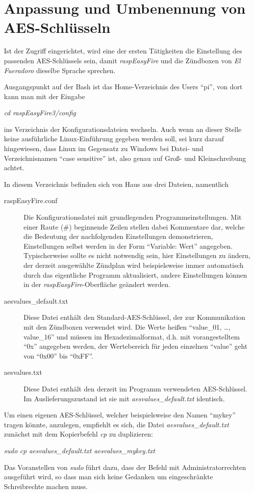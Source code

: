 \documentclass[paper=a4, parskip, numbers=noenddot, toc=listof, headsepline]{scrbook}
\newcommand{\anlage}{\emph{El Fueradoro}}
\newcommand{\REF}{\emph{raspEasyFire}}
\begin{document}
		\section{Anpassung und Umbenennung von AES-Schlüsseln}

			Ist der Zugriff eingerichtet, wird eine der ersten Tätigkeiten die Einstellung des passenden AES-Schlüssels sein, damit {\REF} und die Zündboxen von {\anlage} dieselbe Sprache sprechen.

			Ausgangspunkt auf der Bash ist das Home-Verzeichnis des Users \enquote{pi}, von dort kann man mit der Eingabe
			\begin{center}
				\emph{cd raspEasyFire3/config}
			\end{center}
			ins Verzeichnis der Konfigurationsdateien wechseln. Auch wenn an dieser Stelle keine ausführliche Linux-Einführung gegeben werden soll, sei kurz darauf hingewiesen, dass Linux im Gegensatz zu Windows bei Datei- und Verzeichnisnamen \enquote{case sensitive} ist, also genau auf Groß- und Kleinschreibung achtet.

			In diesem Verzeichnis befinden sich von Haus aus drei Dateien, namentlich
			\begin{description}
				\item[raspEasyFire.conf] Die Konfigurationsdatei mit grundlegenden Programmeinstellungen. Mit einer Raute (\#) beginnende Zeilen stellen dabei Kommentare dar, welche die Bedeutung der nachfolgenden Einstellungen demonstrieren, Einstellungen selbst werden in der Form \enquote{Variable: Wert} angegeben. Typischerweise sollte es nicht notwendig sein, hier Einstellungen zu ändern, der derzeit ausgewählte Zündplan wird beispielsweise immer automatisch durch das eigentliche Programm aktualisiert, andere Einstellungen können in der {\REF}-Oberfläche geändert werden.
				\item[aesvalues\_default.txt] Diese Datei enthält den Standard-AES-Schlüssel, der zur Kommunikation mit den Zündboxen verwendet wird. Die Werte heißen \enquote{value\_01, \dots, value\_16} und müssen im Hexadezimalformat, d.h. mit vorangestelltem \enquote{0x} angegeben werden, der Wertebereich für jeden einzelnen \enquote{value} geht von \enquote{0x00} bis \enquote{0xFF}.
				\item[aesvalues.txt] Diese Datei enthält den derzeit im Programm verwendeten AES-Schlüssel. Im Auslieferungszustand ist sie mit \emph{aesvalues\_default.txt} identisch.
			\end{description}

			Um einen eigenen AES-Schlüssel, welcher beispielsweise den Namen \enquote{mykey} tragen könnte, anzulegen, empfiehlt es sich, die Datei \emph{aesvalues\_default.txt} zunächst mit dem Kopierbefehl \emph{cp} zu duplizieren:
			\begin{center}
				\emph{sudo cp aesvalues\_default.txt aesvalues\_mykey.txt}
			\end{center}
			Das Voranstellen von \emph{sudo} führt dazu, dass der Befehl mit Administratorrechten ausgeführt wird, so dass man sich keine Gedanken um eingeschränkte Schreibrechte machen muss.
\end{document}
